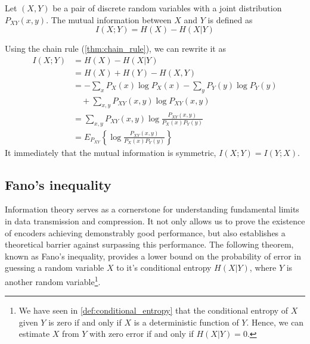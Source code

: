 \begin{definition}\label{def:mutual_information}
    Let $(X,Y)$ be a pair of discrete random variables with a joint distribution $P_{XY}(x,y)$. The mutual information between $X$ and $Y$ is defined as
    \begin{equation}
        I(X;Y) = H(X) - H(X|Y)
    \end{equation}
\end{definition}
\noindent Using the chain rule (\ref{thm:chain_rule}), we can rewrite it as
\begin{align}
    I(X;Y) &= H(X) - H(X|Y) \nonumber \\
    &= H(X) + H(Y) - H(X,Y) \\
    &= -\sum_x P_X(x)\log P_X(x) - \sum_y P_Y(y)\log P_Y(y) \nonumber \\
    & \quad + \sum_{x,y} P_{XY}(x,y)\log P_{XY}(x,y) \\
    &= \sum_{x,y} P_{XY}(x,y)\log \frac{P_{XY}(x,y)}{P_X(x)P_Y(y)} \\
    &= E_{P_{XY}} \left\{ \log \frac{P_{XY}(x,y)}{P_X(x)P_Y(y)} \right\}
\end{align}
It immediately that the mutual information is symmetric, $I(X;Y) = I(Y;X)$.







\subsection{Fano's inequality}

Information theory serves as a cornerstone for understanding fundamental limits in data transmission and compression. It not only allows us to prove the existence of encoders achieving demonstrably good performance, but also establishes a theoretical barrier against surpassing this performance. The following theorem, known as Fano's inequality, provides a lower bound on the probability of error in guessing a random variable $X$ to it's conditional entropy $H(X|Y)$, where $Y$ is another random variable\footnote{We have seen in \ref{def:conditional_entropy} that the conditional entropy of $X$ given $Y$ is zero if and only if $X$ is a deterministic function of $Y$. Hence, we can estimate $X$ from $Y$ with zero error if and only if $H(X|Y) = 0$.}.

